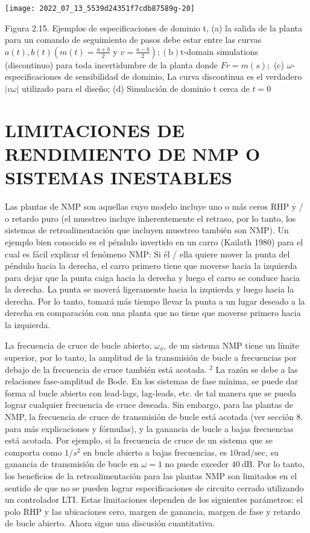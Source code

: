 \texttt{[image: 2022\_07\_13\_5539d24351f7cdb87589g-20]}

Figura 2.15. Ejemplos de especificaciones de dominio t, (a) la salida de la planta para un comando de seguimiento de pasos debe estar entre las curvas $a(t), b(t)\left(m(t)=\frac{a+b}{2}\right.$ y $\left.v=\frac{a-b}{2}\right) ;(\mathrm{b}) \mathrm{t}$-domain simulations (discontinuo) para toda incertidumbre de la planta donde $F r=m(s) ;$ (c) $\omega$-especificaciones de sensibilidad de dominio,  La curva discontinua es el verdadero $|v \omega|$ utilizado para el diseño; (d) Simulación de dominio t cerca de $t=0$

\section{LIMITACIONES DE RENDIMIENTO DE NMP O SISTEMAS INESTABLES}
Las plantas de NMP son aquellas cuyo modelo incluye uno o más ceros RHP y / o retardo puro (el muestreo incluye inherentemente el retraso, por lo tanto, los sistemas de retroalimentación que incluyen muestreo también son NMP). Un ejemplo bien conocido es el péndulo invertido en un carro (Kailath 1980) para el cual es fácil explicar el fenómeno NMP: Si él / ella quiere mover la punta del péndulo hacia la derecha, el carro primero tiene que moverse hacia la izquierda para dejar que la punta caiga hacia la derecha y luego el carro se conduce hacia la derecha. La punta se moverá ligeramente hacia la izquierda y luego hacia la derecha. Por lo tanto, tomará más tiempo llevar la punta a un lugar deseado a la derecha en comparación con una planta que no tiene que moverse primero hacia la izquierda.

La frecuencia de cruce de bucle abierto, $\omega_{\phi}$, de un sistema NMP tiene un límite superior, por lo tanto, la amplitud de la transmisión de bucle a frecuencias por debajo de la frecuencia de cruce también está acotada. ${ }^{2}$ La razón se debe a las relaciones fase-amplitud de Bode. En los sistemas de fase mínima, se puede dar forma al bucle abierto con lead-lags, lag-leads, etc. de tal manera que se pueda lograr cualquier frecuencia de cruce deseada. Sin embargo, para las plantas de NMP, la frecuencia de cruce de transmisión de bucle está acotada (ver sección 8. para más explicaciones y fórmulas), y la ganancia de bucle a bajas frecuencias está acotada. Por ejemplo, si la frecuencia de cruce de un sistema que se comporta como $1 / s^{2}$ en bucle abierto a bajas frecuencias, es $10 \mathrm{rad} / \mathrm{sec}$, su ganancia de transmisión de bucle en $\omega=1$ no puede exceder $40 \mathrm{~dB}$. Por lo tanto, los beneficios de la retroalimentación para las plantas NMP son limitados en el sentido de que no se pueden lograr especificaciones de circuito cerrado utilizando un controlador LTI. Estas limitaciones dependen de los siguientes parámetros: el polo RHP y las ubicaciones cero, margen de ganancia, margen de fase y retardo de bucle abierto. Ahora sigue una discusión cuantitativa.

